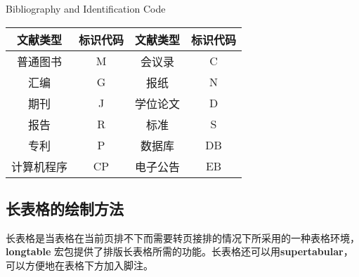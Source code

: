 \begin{table}[htbp]
          {Bibliography and Identification Code}
\label{tab:booktabs}
\centering
\begin{tabular}{cccc}
\toprule
文献类型 & 标识代码 & 文献类型 & 标识代码\\
\midrule
普通图书 & M &  会议录 & C\\
汇编 & G & 报纸 & N\\
期刊 & J & 学位论文 & D\\
报告 & R & 标准 & S\\
专利 & P & 数据库 & DB\\
计算机程序 & CP & 电子公告 & EB\\
\bottomrule
\end{tabular}
\end{table}

\subsection{长表格的绘制方法}

长表格是当表格在当前页排不下而需要转页接排的情况下所采用的一种表格环境，\textbf{longtable} 宏包提供了排版长表格所需的功能。长表格还可以用\textbf{supertabular}，可以方便地在表格下方加入脚注。

